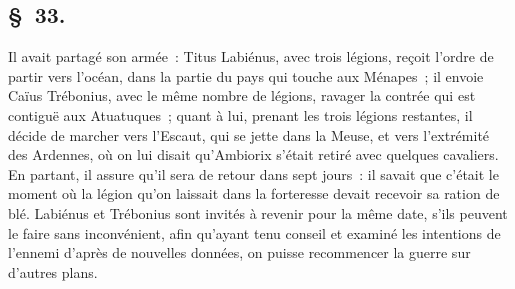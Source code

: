 \documentclass[french,twoside]{book} %
\begin{document}
\subsection[{§ 33.}]{ \textsc{§ 33.} }
\noindent Il avait partagé son armée : Titus Labiénus, avec trois légions, reçoit l’ordre de partir vers l’océan, dans la partie du pays qui touche aux Ménapes ; il envoie Caïus Trébonius, avec le même nombre de légions, ravager la contrée qui est contiguë aux Atuatuques ; quant à lui, prenant les trois légions restantes, il décide de marcher vers l’Escaut, qui se jette dans la Meuse, et vers l’extrémité des Ardennes, où on lui disait qu’Ambiorix s’était retiré avec quelques cavaliers. En partant, il assure qu’il sera de retour dans sept jours : il savait que c’était le moment où la légion qu’on laissait dans la forteresse devait recevoir sa ration de blé. Labiénus et Trébonius sont invités à revenir pour la même date, s’ils peuvent le faire sans inconvénient, afin qu’ayant tenu conseil et examiné les intentions de l’ennemi d’après de nouvelles données, on puisse recommencer la guerre sur d’autres plans.
\end{document}
